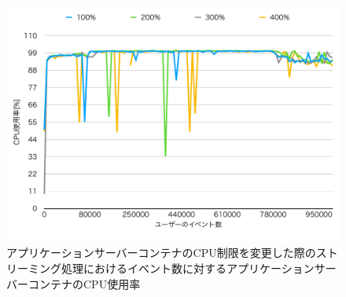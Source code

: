 \documentclass[../../../../../main]{subfiles}
\begin{document}
    \begin{figure}[H]
        \centering
        \includegraphics[width=12cm]{graph}
        \caption{アプリケーションサーバーコンテナのCPU制限を変更した際のストリーミング処理におけるイベント数に対するアプリケーションサーバーコンテナのCPU使用率}
        \label{fig:stream-change-app-cpu-limit-app-cpu-app_1024-db_1_1024}
    \end{figure}
\end{document}
